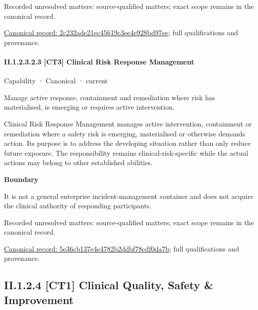 {\small Recorded unresolved matters: source-qualified matters; exact scope remains in the canonical record.}\par
{\footnotesize \href{../../../../continuum/strategy/capability/2c232ade21ec45619c3ee4e928bd97ee.md}{Canonical record: 2c232ade21ec45619c3ee4e928bd97ee}; full qualifications and provenance.}\par
\paragraph*{II.1.2.3.2.3 [CT3] Clinical Risk Response Management}
\label{navigation:II.1.2.3.2.3}

\label{element:5e36cb137e4e4782b2ddbf78cdf0da7b}
{\small Capability · Canonical · current}\par

Manage active response, containment and remediation where risk has materialised, is emerging or requires active intervention.



Clinical Risk Response Management manages active intervention, containment or remediation where a safety risk is emerging, materialised or otherwise demands action. Its purpose is to address the developing situation rather than only reduce future exposure. The responsibility remains clinical-risk-specific while the actual actions may belong to other established abilities.



\textbf{Boundary}



It is not a general enterprise incident-management container and does not acquire the clinical authority of responding participants.


{\small Recorded unresolved matters: source-qualified matters; exact scope remains in the canonical record.}\par
{\footnotesize \href{../../../../continuum/strategy/capability/5e36cb137e4e4782b2ddbf78cdf0da7b.md}{Canonical record: 5e36cb137e4e4782b2ddbf78cdf0da7b}; full qualifications and provenance.}\par
\subsection*{II.1.2.4 [CT1] Clinical Quality, Safety \& Improvement}
\label{navigation:II.1.2.4}

